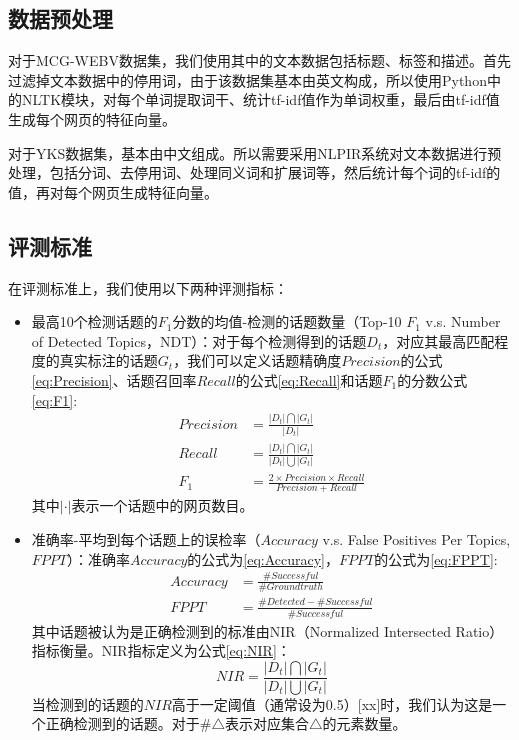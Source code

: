\subsection{数据预处理}

对于MCG-WEBV数据集，我们使用其中的文本数据包括标题、标签和描述。首先过滤掉文本数据中的停用词，由于该数据集基本由英文构成，所以使用Python中的NLTK模块，对每个单词提取词干、统计tf-idf值作为单词权重，最后由tf-idf值生成每个网页的特征向量。

对于YKS数据集，基本由中文组成。所以需要采用NLPIR系统对文本数据进行预处理，包括分词、去停用词、处理同义词和扩展词等，然后统计每个词的tf-idf的值，再对每个网页生成特征向量。

\subsection{评测标准}
在评测标准上，我们使用以下两种评测指标：
\begin{itemize}
  \item 最高10个检测话题的$F_1$分数的均值-检测的话题数量（Top-10 $F_1$ v.s. Number of Detected Topics，NDT）：对于每个检测得到的话题$D_t$，对应其最高匹配程度的真实标注的话题$G_t$，我们可以定义话题精确度$Precision$的公式\ref{eq:Precision}、话题召回率$Recall$的公式\ref{eq:Recall}和话题$F_1$的分数公式\ref{eq:F1}:
  \begin{align}
    \label{eq:Precision} Precision &= \frac{|D_t| \bigcap |G_t|}{|D_t|}\\
    \label{eq:Recall} Recall &= \frac{|D_t| \bigcap |G_t|}{|D_t| \bigcup |G_t|}\\
    \label{eq:F1} F_1 &= \frac{2\times Precision \times Recall}{Precision + Recall}
  \end{align}
  其中$|\cdot|$表示一个话题中的网页数目。

  \item 准确率-平均到每个话题上的误检率（$Accuracy$ v.s. False Positives Per Topics,$FPPT$）：准确率$Accuracy$的公式为\ref{eq:Accuracy}，$FPPT$的公式为\ref{eq:FPPT}:
  \begin{align}
    \label{eq:Accuracy} Accuracy &= \frac{\#Successful}{\#Groundtruth} \\
    \label{eq:FPPT} FPPT &= \frac{\#Detected - \#Successful}{\#Successful}
  \end{align}
  其中话题被认为是正确检测到的标准由NIR（Normalized Intersected Ratio）指标衡量。NIR指标定义为公式\ref{eq:NIR}：
  \begin{equation}\label{eq:NIR}
    NIR = \frac{|D_t| \bigcap |G_t|}{|D_t| \bigcup |G_t|}
  \end{equation}
  当检测到的话题的$NIR$高于一定阈值（通常设为0.5）[xx]时，我们认为这是一个正确检测到的话题。对于$\# \triangle$表示对应集合$\triangle$的元素数量。
\end{itemize}

